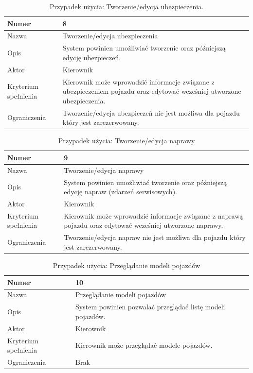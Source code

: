 \documentclass[eng,printmode,openany]{mgr}
\begin{document}
	\begin{table}[H]
		\caption{Przypadek użycia: Tworzenie/edycja ubezpieczenia.}
		\begin{tabularx}{\textwidth}{|l|X|}
			\hline
			Numer                & 8  \\ \hline
			Nazwa                & Tworzenie/edycja ubezpieczenia \\ \hline
			Opis                 & System powinien umożliwiać tworzenie oraz późniejszą edycję ubezpieczeń. \\ \hline
			Aktor                & Kierownik \\ \hline
			Kryterium spełnienia & Kierownik może wprowadzić informacje związane z ubezpieczeniem pojazdu oraz edytować wcześniej utworzone ubezpieczenia. \\ \hline
			Ograniczenia         & Tworzenie/edycja ubezpieczeń nie jest możliwa dla pojazdu który jest zarezerwowany. \\ \hline
		\end{tabularx}
	\end{table}
	
	\begin{table}[H]
		\caption{Przypadek użycia: Tworzenie/edycja naprawy}
		\begin{tabularx}{\textwidth}{|l|X|}
			\hline
			Numer                & 9  \\ \hline
			Nazwa                & Tworzenie/edycja naprawy \\ \hline
			Opis                 & System powinien umożliwiać tworzenie oraz późniejszą edycję napraw (zdarzeń serwisowych). \\ \hline
			Aktor                & Kierownik \\ \hline
			Kryterium spełnienia & Kierownik może wprowadzić informacje związane z naprawą pojazdu oraz edytować wcześniej utworzone naprawy. \\ \hline
			Ograniczenia         & Tworzenie/edycja napraw nie jest możliwa dla pojazdu który jest zarezerwowany. \\ \hline
		\end{tabularx}
	\end{table}
	
	\begin{table}[H]
		\caption{Przypadek użycia: Przeglądanie modeli pojazdów}
		\begin{tabularx}{\textwidth}{|l|X|}
			\hline
			Numer                & 10  \\ \hline
			Nazwa                & Przeglądanie modeli pojazdów \\ \hline
			Opis                 & System powinien pozwalać przeglądać listę modeli pojazdów. \\ \hline
			Aktor                & Kierownik \\ \hline
			Kryterium spełnienia & Kierownik może przeglądać modele pojazdów. \\ \hline
			Ograniczenia         & Brak \\ \hline
		\end{tabularx}
	\end{table}
	
\end{document}
